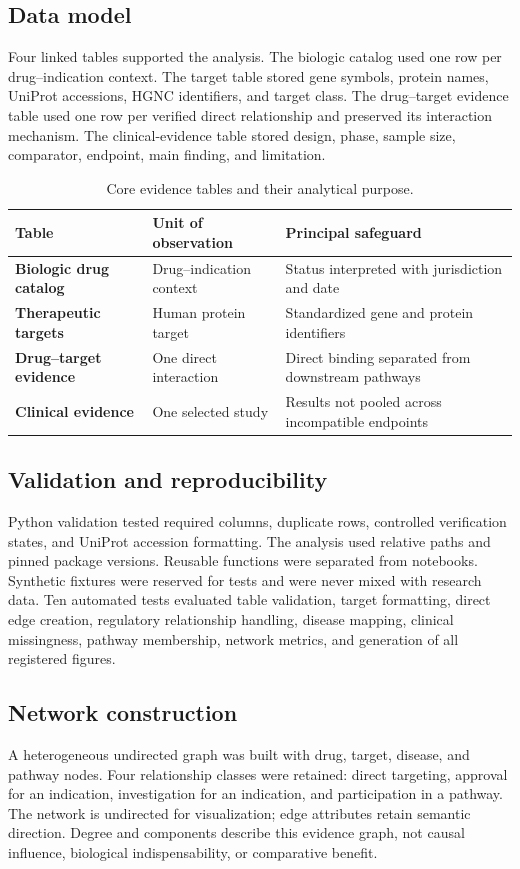 \documentclass[12pt,a4paper]{article}
\begin{document}
\subsection{Data model}
Four linked tables supported the analysis. The biologic catalog used one row per drug--indication context. The target table stored gene symbols, protein names, UniProt accessions, HGNC identifiers, and target class. The drug--target evidence table used one row per verified direct relationship and preserved its interaction mechanism. The clinical-evidence table stored design, phase, sample size, comparator, endpoint, main finding, and limitation.

\begin{table}[htbp]\centering
\caption{Core evidence tables and their analytical purpose.}\label{tab:data-model}
\begin{tabularx}{\textwidth}{>{\bfseries}p{}YY}\toprule
Table & Unit of observation & Principal safeguard \\\midrule
Biologic drug catalog & Drug--indication context & Status interpreted with jurisdiction and date \\
Therapeutic targets & Human protein target & Standardized gene and protein identifiers \\
Drug--target evidence & One direct interaction & Direct binding separated from downstream pathways \\
Clinical evidence & One selected study & Results not pooled across incompatible endpoints \\\bottomrule
\end{tabularx}\end{table}

\subsection{Validation and reproducibility}
Python validation tested required columns, duplicate rows, controlled verification states, and UniProt accession formatting. The analysis used relative paths and pinned package versions. Reusable functions were separated from notebooks. Synthetic fixtures were reserved for tests and were never mixed with research data. Ten automated tests evaluated table validation, target formatting, direct edge creation, regulatory relationship handling, disease mapping, clinical missingness, pathway membership, network metrics, and generation of all registered figures.

\subsection{Network construction}
A heterogeneous undirected graph was built with drug, target, disease, and pathway nodes. Four relationship classes were retained: direct targeting, approval for an indication, investigation for an indication, and participation in a pathway. The network is undirected for visualization; edge attributes retain semantic direction. Degree and components describe this evidence graph, not causal influence, biological indispensability, or comparative benefit.
\end{document}
